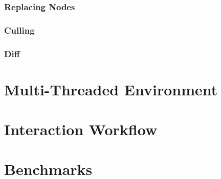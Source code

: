 \begin{lstlisting}[language = FSharp]
\end{lstlisting}

\subsubsection{Replacing Nodes}
\subsubsection{Culling}
\subsubsection{Diff}

\section{Multi-Threaded Environment}



\section{Interaction Workflow}
\section{Benchmarks}